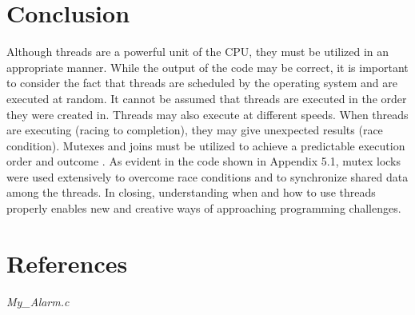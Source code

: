 \documentclass[11pt]{article}
\newcommand{\forceindent}{\leavevmode{\parindent=1em\indent}}
\begin{document}
\section{Conclusion}

\forceindent Although threads are a powerful unit of the CPU, they must be utilized in an appropriate manner. While the output of the code may be correct, it is important to consider the fact that threads are scheduled by the operating system and are executed at random. It cannot be assumed that threads are executed in the order they were created in. Threads may also execute at different speeds. When threads are executing (racing to completion), they may give unexpected results (race condition). Mutexes and joins must be utilized to achieve a predictable execution order and outcome \cite{Blelloch}. As evident in the code shown in Appendix 5.1, mutex locks were used extensively to overcome race conditions and to synchronize shared data among the threads. In closing, understanding when and how to use threads properly enables new and creative ways of approaching programming challenges.


\section{References}
\begingroup
\renewcommand{\section}[2]{}%
\nocite{*}


\endgroup

\section{Appendix}
	\subsection{\emph{My\_Alarm.c}}
	\lstset{language=C}        
\end{document}
